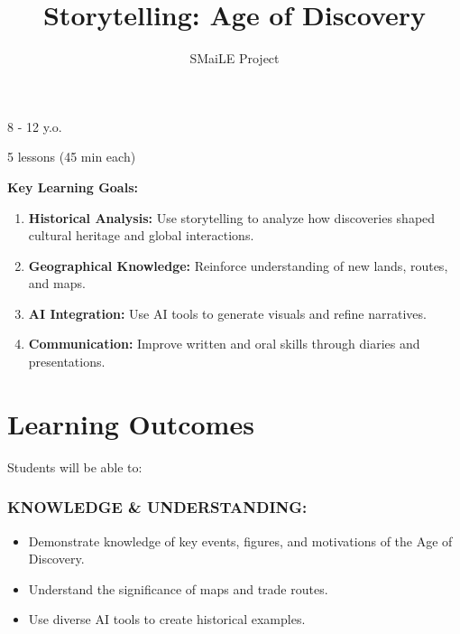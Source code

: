 \documentclass[11pt, a4paper]{article}
\begin{document}
\title{\textbf{\color{SmaileBlue}Storytelling: Age of Discovery}}
\author{SMaiLE Project}
\date{}
\maketitle
\thispagestyle{plain}

\begin{keyinfobox}
    \begin{description}[leftmargin=*, labelindent=0pt]
        \item[\bfseries\color{SmaileBlue} Target Group:] 8 - 12 y.o.
        \item[\bfseries\color{SmaileBlue} Duration:] 5 lessons (45 min each)
    \end{description}
    \textbf{Key Learning Goals:}
    \begin{enumerate}
        \item \textbf{Historical Analysis:} Use storytelling to analyze how discoveries shaped cultural heritage and global interactions.
        \item \textbf{Geographical Knowledge:} Reinforce understanding of new lands, routes, and maps.
        \item \textbf{AI Integration:} Use AI tools to generate visuals and refine narratives.
        \item \textbf{Communication:} Improve written and oral skills through diaries and presentations.
    \end{enumerate}
\end{keyinfobox}

\section*{Learning Outcomes}
Students will be able to:

\subsubsection*{KNOWLEDGE \& UNDERSTANDING:}
\begin{itemize}
    \item Demonstrate knowledge of key events, figures, and motivations of the Age of Discovery.
    \item Understand the significance of maps and trade routes.
    \item Use diverse AI tools to create historical examples.
\end{itemize}
\end{document}
